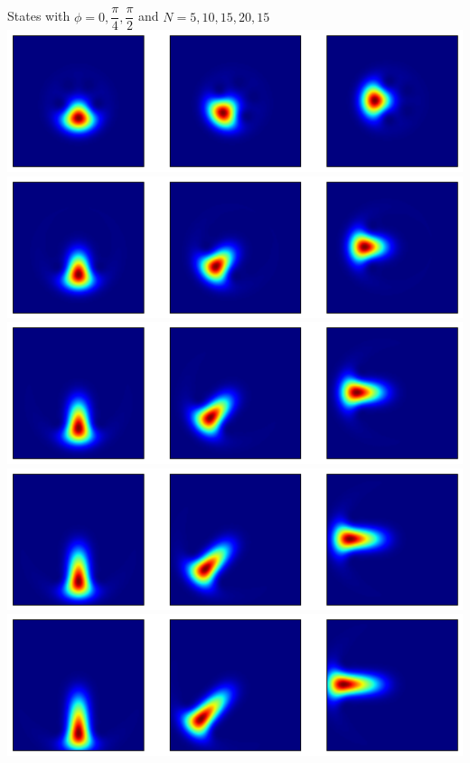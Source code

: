 \documentclass[10pt,fleqn]{article}
\begin{document}
\subsection{}
States with $\phi=0, \dfrac\pi4, \dfrac\pi2$ and $N=5,10,15,20,15$\\
\includegraphics[width=15cm]{3-3-5.png}\\
\includegraphics[width=15cm]{3-3-10.png}\\
\includegraphics[width=15cm]{3-3-15.png}\\
\includegraphics[width=15cm]{3-3-20.png}\\
\includegraphics[width=15cm]{3-3-25.png}\\
\end{document}
